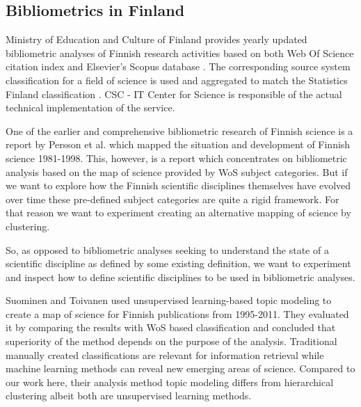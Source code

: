 



\subsection{Bibliometrics in Finland}
Ministry of Education and Culture of Finland provides yearly
updated bibliometric analyses of Finnish research activities 
based on both Web Of Science citation index 
and Elsevier's Scopus database \cite[Vipunen 
service]{noauthor_ministry_2020}. The corresponding source 
system classification for a field of science is used and
aggregated to match the Statistics Finland classification 
\cite{auranen_tieteen_2018}. CSC - 
IT Center for Science is responsible of the actual technical 
implementation of the service.

One of the earlier and comprehensive bibliometric research of 
Finnish science is a report by Persson et al. 
\cite{persson_bibliometric_2000} which mapped the situation and 
development of Finnish science 1981-1998.
This, however, is a report which concentrates on bibliometric 
analysis based on the map of science provided by WoS subject 
categories. But if we want to explore how the Finnish scientific 
disciplines themselves have evolved over time these pre-defined 
subject categories are quite a rigid framework. For that reason we 
want to experiment creating an alternative mapping of science by 
clustering. 

So, as opposed to bibliometric analyses seeking to understand the
state of a scientific discipline as defined by some existing 
definition, we want to experiment and inspect how to define 
scientific disciplines to be used in bibliometric analyses.


Suominen and Toivanen \cite{suominen_map_2016} used unsupervised learning-based topic 
modeling to create a map of science for Finnish publications from 
1995-2011. They evaluated it by comparing the results with WoS 
based classification and concluded that superiority of the method
depends on the purpose of the analysis. Traditional manually created 
classifications are relevant for information retrieval while 
machine learning methods can reveal new emerging areas of science.
Compared to our work here, their 
analysis method topic modeling differs from hierarchical 
clustering albeit both are unsupervised learning methods.

